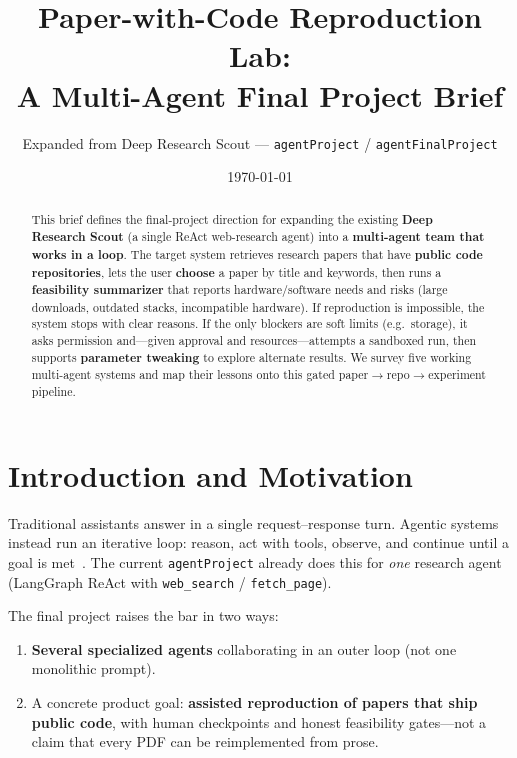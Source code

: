 \documentclass[11pt,a4paper]{article}
\title{Paper-with-Code Reproduction Lab:\\
A Multi-Agent Final Project Brief}
\author{Expanded from Deep Research Scout --- \texttt{agentProject} / \texttt{agentFinalProject}}
\date{\today}
\begin{document}
\maketitle

\begin{abstract}
This brief defines the final-project direction for expanding the existing
\textbf{Deep Research Scout} (a single ReAct web-research agent) into a
\textbf{multi-agent team that works in a loop}. The target system retrieves
research papers that have \textbf{public code repositories}, lets the user
\textbf{choose} a paper by title and keywords, then runs a
\textbf{feasibility summarizer} that reports hardware/software needs and
risks (large downloads, outdated stacks, incompatible hardware). If
reproduction is impossible, the system stops with clear reasons. If the only
blockers are soft limits (e.g.\ storage), it asks permission and---given
approval and resources---attempts a sandboxed run, then supports
\textbf{parameter tweaking} to explore alternate results. We survey five
working multi-agent systems and map their lessons onto this gated
paper$\rightarrow$repo$\rightarrow$experiment pipeline.
\end{abstract}

\tableofcontents
\newpage

\section{Introduction and Motivation}

Traditional assistants answer in a single request--response turn. Agentic
systems instead run an iterative loop: reason, act with tools, observe, and
continue until a goal is met~\cite{blogreact}. The current
\texttt{agentProject} already does this for \emph{one} research agent
(LangGraph ReAct with \texttt{web\_search} / \texttt{fetch\_page}).

The final project raises the bar in two ways:
\begin{enumerate}[leftmargin=*]
  \item \textbf{Several specialized agents} collaborating in an outer loop
        (not one monolithic prompt).
  \item A concrete product goal: \textbf{assisted reproduction of papers that
        ship public code}, with human checkpoints and honest feasibility
        gates---not a claim that every PDF can be reimplemented from prose.
\end{enumerate}
\end{document}
